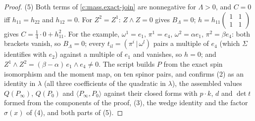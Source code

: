 \documentclass[11pt]{article}
\theoremstyle{definition}
\theoremstyle{plain}
\providecommand{\hp}{}\renewcommand{\hp}[2]{( #1 \,|\, #2 )}
\providecommand{\ip}{}\renewcommand{\ip}[2]{\langle #1, #2\rangle}
\begin{document}
\begin{proof}
(5) Both terms of \ref{c:mass.exact-join} are nonnegative for $\Lambda > 0$, and $C = 0$ iff $h_{11} = h_{22}$ and $h_{12} = 0$. For $Z^{2} = Z^{1}$: $Z\wedge Z = 0$ gives $B_{\Lambda} = 0$; $h = h_{11}\left(\begin{smallmatrix}1&1\\1&1\end{smallmatrix}\right)$ gives $C = \tfrac14\cdot 0 + h_{11}^{2}$. For the example, $\omega^{1} = e_{1}$, $\pi^{1} = e_{4}$, $\omega^{2} = \alpha e_{1}$, $\pi^{2} = \beta e_{4}$: both brackets vanish, so $B_{\Lambda} = 0$; every $t_{il} = \hp{\pi^{i}}{\omega^{l}}$ pairs a multiple of $e_{4}$ (which $\Sigma$ identifies with $e_{2}$) against a multiple of $e_{1}$ and vanishes, so $h = 0$; and $Z^{1}\wedge Z^{2} = (\beta - \alpha)\,e_{1}\wedge e_{4} \neq 0$. The script builds $P$ from the exact spin isomorphism and the moment map, on ten spinor pairs, and confirms (2) as an identity in $\lambda$ (all three coefficients of the quadratic in $\lambda$), the assembled values $Q(P_{\infty})$, $Q(P_{0})$ and $\ip{P_{\infty}}{P_{0}}$ against their closed forms with $p\cdot k$, $d$ and $\det t$ formed from the components of the proof, (3), the wedge identity and the factor $\sigma(x)$ of (4), and both parts of (5).

\end{proof}
\end{document}
